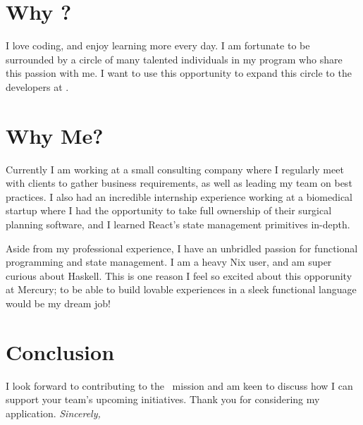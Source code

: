 \section{Why \companyName?}
I love coding, and enjoy learning more every day. I am fortunate to be surrounded by a circle of many talented individuals in my program who share this passion with me. I want to use this opportunity to expand this circle to the developers at \companyName.

\section{Why Me?}
	Currently I am working at a small consulting company where I regularly meet with clients to gather business requirements, as well as leading my team on best practices. I also had an incredible internship experience working at a biomedical startup where I had the opportunity to take full ownership of their surgical planning software, and I learned React's state management primitives in-depth.

	Aside from my professional experience, I have an unbridled passion for functional programming and state management. I am a heavy Nix user, and am super curious about Haskell. This is one reason I feel so excited about this opporunity at Mercury; to be able to build lovable experiences in a sleek functional language would be my dream job!

\section{Conclusion}
I look forward to contributing to the \companyName~mission and am keen to discuss how I can support your team's upcoming initiatives. Thank you for considering my application.
\newline
\newline
\large{
	\textit{Sincerely,}\\
	\userFullName
}


